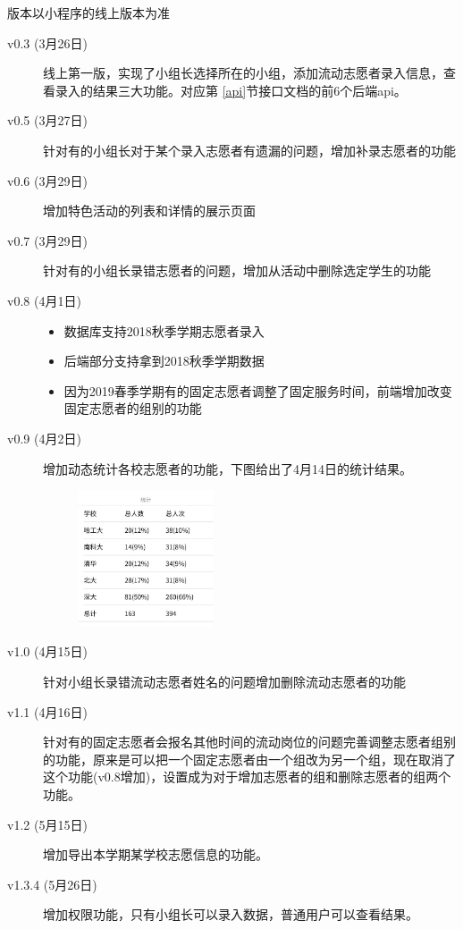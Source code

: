 \documentclass[]{ctexart}
\begin{document}
版本以小程序的线上版本为准
\begin{description}
 \item[v0.3 (3月26日)]

线上第一版，实现了小组长选择所在的小组，添加流动志愿者录入信息，查看录入的结果三大功能。对应第 \ref{api}节接口文档的前6个后端api。

\item[v0.5 (3月27日)]
针对有的小组长对于某个录入志愿者有遗漏的问题，增加补录志愿者的功能

\item[v0.6 (3月29日)]
增加特色活动的列表和详情的展示页面

\item[v0.7 (3月29日)]
针对有的小组长录错志愿者的问题，增加从活动中删除选定学生的功能

\item[v0.8 (4月1日)]
\begin{itemize}
\item
  数据库支持2018秋季学期志愿者录入
\item
  后端部分支持拿到2018秋季学期数据
\item
  因为2019春季学期有的固定志愿者调整了固定服务时间，前端增加改变固定志愿者的组别的功能
\end{itemize}

\item[v0.9 (4月2日)]
增加动态统计各校志愿者的功能，下图给出了4月14日的统计结果。
\begin{figure}[!ht]
\centering
\includegraphics[width=4cm]{assets/volunteer_statistics.jpg}
\end{figure}
\item[v1.0 (4月15日)]
针对小组长录错流动志愿者姓名的问题增加删除流动志愿者的功能

\item[v1.1 (4月16日)]
针对有的固定志愿者会报名其他时间的流动岗位的问题完善调整志愿者组别的功能，原来是可以把一个固定志愿者由一个组改为另一个组，现在取消了这个功能(v0.8增加)，设置成为对于增加志愿者的组和删除志愿者的组两个功能。

\item[v1.2 (5月15日)]
增加导出本学期某学校志愿信息的功能。

\item[v1.3.4 (5月26日)]
增加权限功能，只有小组长可以录入数据，普通用户可以查看结果。
\end{description}
\end{document}
